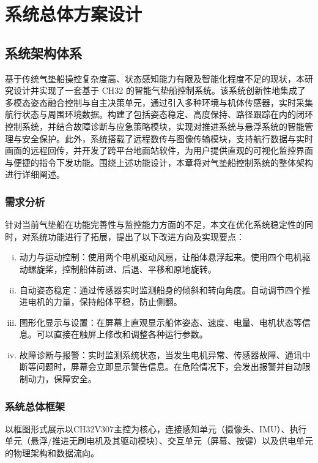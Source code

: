 \section{系统总体方案设计}
\subsection{系统架构体系}
基于传统气垫船操控复杂度高、状态感知能力有限及智能化程度不足的现状，本研究设计并实现了一套基于 CH32 的智能气垫船控制系统。该系统创新性地集成了多模态姿态融合控制与自主决策单元，通过引入多种环境与机体传感器，实时采集航行状态与周围环境数据。构建了包括姿态稳定、高度保持、路径跟踪在内的闭环控制系统，并结合故障诊断与应急策略模块，实现对推进系统与悬浮系统的智能管理与安全保护。此外，系统搭载了远程数传与图像传输模块，支持航行数据与实时画面的远程回传，并开发了跨平台地面站软件，为用户提供直观的可视化监控界面与便捷的指令下发功能。围绕上述功能设计，本章将对气垫船控制系统的整体架构进行详细阐述。
\subsubsection{需求分析} 
针对当前气垫船在功能完善性与监控能力方面的不足，本文在优化系统稳定性的同时，对系统功能进行了拓展，提出了以下改进方向及实现要点：
\begin{enumerate}[i)]
    \item 动力与运动控制：使用两个电机驱动风扇，让船体悬浮起来。使用四个电机驱动螺旋桨，控制船体前进、后退、平移和原地旋转。
    \item 自动姿态稳定：通过传感器实时监测船身的倾斜和转向角度。自动调节四个推进电机的力量，保持船体平稳，防止侧翻。
    \item 图形化显示与设置：在屏幕上直观显示船体姿态、速度、电量、电机状态等信息。可以直接在触屏上修改和调整各种运行参数。
    \item 故障诊断与报警：实时监测系统状态，当发生电机异常、传感器故障、通讯中断等问题时，屏幕会立即显示警告信息。在危险情况下，会发出报警并自动限制动力，保障安全。
    \end{enumerate} 

\subsubsection{系统总体框架}
以框图形式展示以CH32V307主控为核心，连接感知单元（摄像头、IMU）、执行单元（悬浮/推进无刷电机及其驱动模块）、交互单元（屏幕、按键）以及供电单元的物理架构和数据流向。
